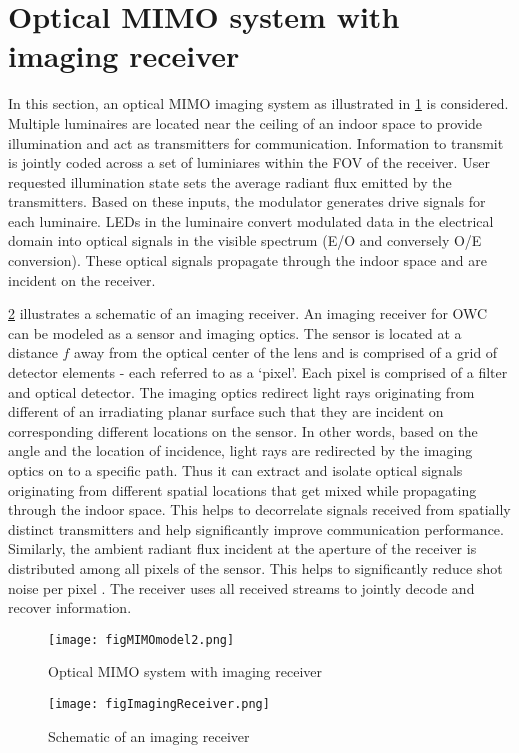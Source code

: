 \section{Optical MIMO system with imaging receiver}
\label{sec:mimoImaging}

\graphicspath{{_MIMOSpace/figures_mimoImg/}}
In this section, an optical MIMO imaging system as illustrated in \figurename{ \ref{figMIMOblock}} is considered. Multiple luminaires are located near the ceiling of an indoor space to provide illumination and act as transmitters for communication. Information to transmit is jointly coded across a set of luminiares within the FOV of the receiver. User requested illumination state sets the average radiant flux emitted by the transmitters. Based on these inputs, the modulator generates drive signals for each luminaire. LEDs in the luminaire convert modulated data in the electrical domain into optical signals in the visible spectrum (E/O and conversely O/E conversion). These optical signals propagate through the indoor space and are incident on the receiver. 

\figurename{ \ref{figImagingReceiver}} illustrates a schematic of an imaging receiver. An imaging receiver for OWC can be modeled as a sensor and imaging optics. The sensor is located at a distance $f$ away from the optical center of the lens and is comprised of a grid of detector elements - each referred to as a `pixel'. Each pixel is comprised of a filter and optical detector. The imaging optics redirect light rays originating from different of an irradiating planar surface such that they are incident on corresponding different locations on the sensor. In other words, based on the angle and the location of incidence, light rays are redirected by the imaging optics on to a specific path. Thus it can extract and isolate optical signals originating from different spatial locations that get mixed while propagating through the indoor space. This helps to decorrelate signals received from spatially distinct transmitters and help significantly improve communication performance. Similarly, the ambient radiant flux incident at the aperture of the receiver is distributed among all pixels of the sensor. This helps to significantly reduce shot noise per pixel \cite{dja00a}. The receiver uses all received streams to jointly decode and recover information. 
\begin{figure}[t]
	\centering
		\texttt{[image: figMIMOmodel2.png]}
	\caption{Optical MIMO system with imaging receiver}
	\label{figMIMOblock}
\end{figure}
\begin{figure}[b]
	\centering
		\texttt{[image: figImagingReceiver.png]}
	\caption{Schematic of an imaging receiver}
	\label{figImagingReceiver}
\end{figure}

